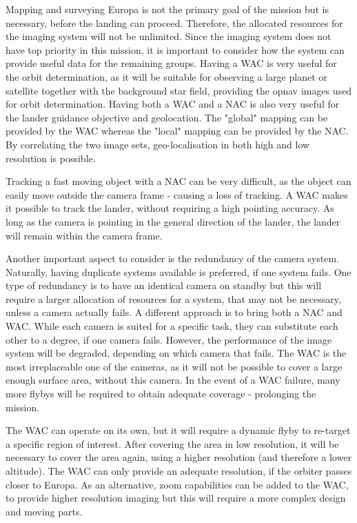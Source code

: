 Mapping and surveying Europa is not the primary goal of the mission but is necessary, before the landing can proceed. Therefore, the allocated resources for the imaging system will not be unlimited. Since the imaging system does not have top priority in this mission, it is important to consider how the system can provide useful data for the remaining groups. Having a WAC is very useful for the orbit determination, as it will be suitable for observing a large planet or satellite together with the background star field, providing the opnav images used for orbit determination. Having both a WAC and a NAC is also very useful for the lander guidance objective and geolocation. The "global" mapping can be provided by the WAC whereas the "local" mapping can be provided by the NAC. By correlating the two image sets, geo-localisation in both high and low resolution is possible.

Tracking a fast moving object with a NAC can be very difficult, as the object can easily move outside the camera frame - causing a loss of tracking. A WAC makes it possible to track the lander, without requiring a high pointing accuracy. As long as the camera is pointing in the general direction of the lander, the lander will remain within the camera frame.

Another important aspect to consider is the redundancy of the camera system. Naturally, having duplicate systems available is preferred, if one system fails. One type of redundancy is to have an identical camera on standby but this will require a larger allocation of resources for a system, that may not be necessary, unless a camera actually fails. A different approach is to bring both a NAC and WAC. While each camera is suited for a specific task, they can substitute each other to a degree, if one camera fails. However, the performance of the image system will be degraded, depending on which camera that fails. The WAC is the most irreplaceable one of the cameras, as it will not be possible to cover a large enough surface area, without this camera. In the event of a WAC failure, many more flybys will be required to obtain adequate coverage - prolonging the mission.

The WAC can operate on its own, but it will require a dynamic flyby to re-target a specific region of interest. After covering the area in low resolution, it will be necessary to cover the area again, using a higher resolution (and therefore a lower altitude). The WAC can only provide an adequate resolution, if the orbiter passes closer to Europa. As an alternative, zoom capabilities can be added to the WAC, to provide higher resolution imaging but this will require a more complex design and moving parts.

